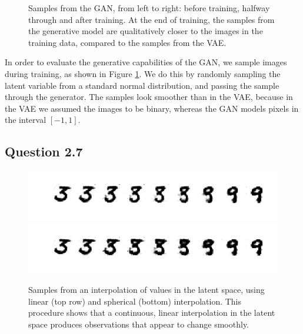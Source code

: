 \documentclass{article}
\begin{document}
\begin{figure}[t]
\begin{subfigure}{0.32\textwidth}
\end{subfigure}
 \caption{Samples from the GAN, from left to right: before training, halfway through and after training. At the end of training, the samples from the generative model are qualitatively closer to the images in the training data, compared to the samples from the VAE.}
\label{fig:gan_samples}
\end{figure}

In order to evaluate the generative capabilities of the GAN, we sample images during training, as shown in Figure \ref{fig:gan_samples}. We do this by randomly sampling the latent variable from a standard normal distribution, and passing the sample through the generator. The samples look smoother than in the VAE, because in the VAE we assumed the images to be binary, whereas the GAN models pixels in the interval $[-1, 1]$.

\subsection*{Question 2.7}

\begin{figure}[t]
\centering
\includegraphics[scale=0.7]{img/gan_lerp}\\
\includegraphics[scale=0.7]{img/gan_slerp}
\caption{Samples from an interpolation of values in the latent space, using linear (top row) and spherical (bottom) interpolation. This procedure shows that a continuous, linear interpolation in the latent space produces observations that appear to change smoothly.}
\label{fig:gan_interp}
\end{figure}
\end{document}
